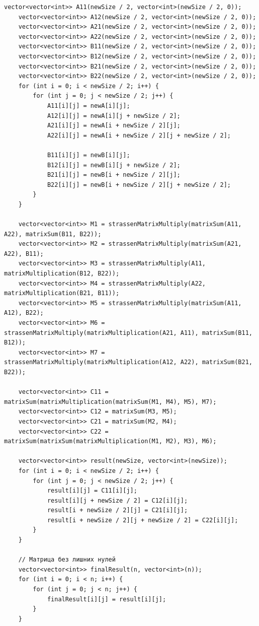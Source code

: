 \documentclass[12pt, a4paper]{article}
\begin{document}
\begin{lstlisting}[caption={Исходный код}, label={lst:label1}]
    vector<vector<int>> A11(newSize / 2, vector<int>(newSize / 2, 0));
    vector<vector<int>> A12(newSize / 2, vector<int>(newSize / 2, 0));
    vector<vector<int>> A21(newSize / 2, vector<int>(newSize / 2, 0));
    vector<vector<int>> A22(newSize / 2, vector<int>(newSize / 2, 0));
    vector<vector<int>> B11(newSize / 2, vector<int>(newSize / 2, 0));
    vector<vector<int>> B12(newSize / 2, vector<int>(newSize / 2, 0));
    vector<vector<int>> B21(newSize / 2, vector<int>(newSize / 2, 0));
    vector<vector<int>> B22(newSize / 2, vector<int>(newSize / 2, 0));
    for (int i = 0; i < newSize / 2; i++) {
        for (int j = 0; j < newSize / 2; j++) {
            A11[i][j] = newA[i][j];
            A12[i][j] = newA[i][j + newSize / 2];
            A21[i][j] = newA[i + newSize / 2][j];
            A22[i][j] = newA[i + newSize / 2][j + newSize / 2];

            B11[i][j] = newB[i][j];
            B12[i][j] = newB[i][j + newSize / 2];
            B21[i][j] = newB[i + newSize / 2][j];
            B22[i][j] = newB[i + newSize / 2][j + newSize / 2];
        }
    }

    vector<vector<int>> M1 = strassenMatrixMultiply(matrixSum(A11, A22), matrixSum(B11, B22));
    vector<vector<int>> M2 = strassenMatrixMultiply(matrixSum(A21, A22), B11);
    vector<vector<int>> M3 = strassenMatrixMultiply(A11, matrixMultiplication(B12, B22));
    vector<vector<int>> M4 = strassenMatrixMultiply(A22, matrixMultiplication(B21, B11));
    vector<vector<int>> M5 = strassenMatrixMultiply(matrixSum(A11, A12), B22);
    vector<vector<int>> M6 = strassenMatrixMultiply(matrixMultiplication(A21, A11), matrixSum(B11, B12));
    vector<vector<int>> M7 = strassenMatrixMultiply(matrixMultiplication(A12, A22), matrixSum(B21, B22));

    vector<vector<int>> C11 = matrixSum(matrixMultiplication(matrixSum(M1, M4), M5), M7);
    vector<vector<int>> C12 = matrixSum(M3, M5);
    vector<vector<int>> C21 = matrixSum(M2, M4);
    vector<vector<int>> C22 = matrixSum(matrixSum(matrixMultiplication(M1, M2), M3), M6);

    vector<vector<int>> result(newSize, vector<int>(newSize));
    for (int i = 0; i < newSize / 2; i++) {
        for (int j = 0; j < newSize / 2; j++) {
            result[i][j] = C11[i][j];
            result[i][j + newSize / 2] = C12[i][j];
            result[i + newSize / 2][j] = C21[i][j];
            result[i + newSize / 2][j + newSize / 2] = C22[i][j];
        }
    }

    // Матрица без лишних нулей
    vector<vector<int>> finalResult(n, vector<int>(n));
    for (int i = 0; i < n; i++) {
        for (int j = 0; j < n; j++) {
            finalResult[i][j] = result[i][j];
        }
    }


\end{lstlisting}
\end{document}
